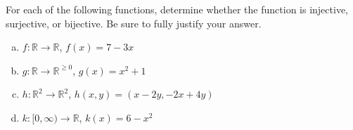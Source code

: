 \documentclass[11pt,letterpaper]{article}
\begin{document}

 For each of the following functions, determine whether the function is injective, surjective, or bijective. Be sure to fully justify your answer.
	\begin{enumerate}[(a)]
	\item $f: \mathbb{R} \to \mathbb{R}$, $f(x)= 7 - 3x$
	\item $g: \mathbb{R} \to \mathbb{R}^{\geq 0}$, $g(x)= x^2 + 1$
	\item $h: \mathbb{R}^2 \to \mathbb{R}^2$, $h(x, y)= (x - 2y, -2x + 4y)$
	\item $k: [0, \infty) \to \mathbb{R}$, $k(x)= 6 - x^2$
	\end{enumerate} \pspace
\end{document}
